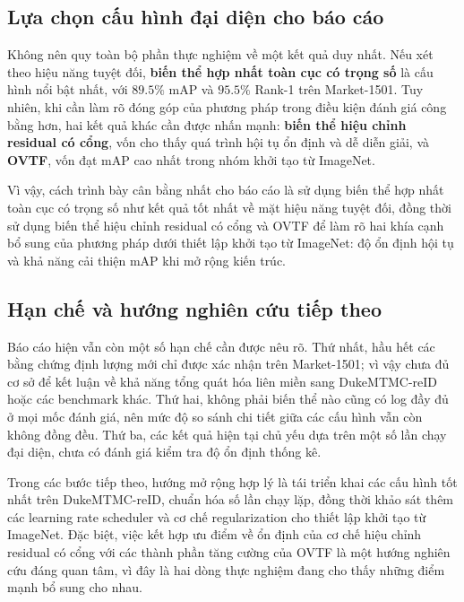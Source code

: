 \subsection{Lựa chọn cấu hình đại diện cho báo cáo}

Không nên quy toàn bộ phần thực nghiệm về một kết quả duy nhất. Nếu xét theo hiệu năng tuyệt đối, \textbf{biến thể hợp nhất toàn cục có trọng số} là cấu hình nổi bật nhất, với $89.5\%$ mAP và $95.5\%$ Rank-1 trên Market-1501. Tuy nhiên, khi cần làm rõ đóng góp của phương pháp trong điều kiện đánh giá công bằng hơn, hai kết quả khác cần được nhấn mạnh: \textbf{biến thể hiệu chỉnh residual có cổng}, vốn cho thấy quá trình hội tụ ổn định và dễ diễn giải, và \textbf{OVTF}, vốn đạt mAP cao nhất trong nhóm khởi tạo từ ImageNet.

Vì vậy, cách trình bày cân bằng nhất cho báo cáo là sử dụng biến thể hợp nhất toàn cục có trọng số như kết quả tốt nhất về mặt hiệu năng tuyệt đối, đồng thời sử dụng biến thể hiệu chỉnh residual có cổng và OVTF để làm rõ hai khía cạnh bổ sung của phương pháp dưới thiết lập khởi tạo từ ImageNet: độ ổn định hội tụ và khả năng cải thiện mAP khi mở rộng kiến trúc.

\subsection{Hạn chế và hướng nghiên cứu tiếp theo}

Báo cáo hiện vẫn còn một số hạn chế cần được nêu rõ. Thứ nhất, hầu hết các bằng chứng định lượng mới chỉ được xác nhận trên Market-1501; vì vậy chưa đủ cơ sở để kết luận về khả năng tổng quát hóa liên miền sang DukeMTMC-reID hoặc các benchmark khác. Thứ hai, không phải biến thể nào cũng có log đầy đủ ở mọi mốc đánh giá, nên mức độ so sánh chi tiết giữa các cấu hình vẫn còn không đồng đều. Thứ ba, các kết quả hiện tại chủ yếu dựa trên một số lần chạy đại diện, chưa có đánh giá kiểm tra độ ổn định thống kê.

Trong các bước tiếp theo, hướng mở rộng hợp lý là tái triển khai các cấu hình tốt nhất trên DukeMTMC-reID, chuẩn hóa số lần chạy lặp, đồng thời khảo sát thêm các learning rate scheduler và cơ chế regularization cho thiết lập khởi tạo từ ImageNet. Đặc biệt, việc kết hợp ưu điểm về ổn định của cơ chế hiệu chỉnh residual có cổng với các thành phần tăng cường của OVTF là một hướng nghiên cứu đáng quan tâm, vì đây là hai dòng thực nghiệm đang cho thấy những điểm mạnh bổ sung cho nhau.
